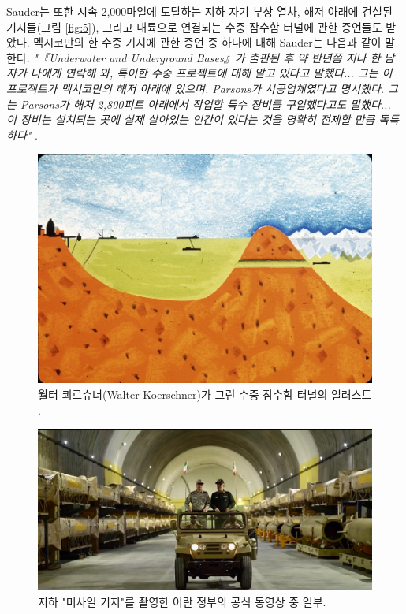 \documentclass[10pt,twocolumn,letterpaper]{article}
\begin{document}
Sauder는 또한 시속 2,000마일에 도달하는 지하 자기 부상 열차, 해저 아래에 건설된 기지들(그림 \ref{fig:5}), 그리고 내륙으로 연결되는 수중 잠수함 터널에 관한 증언들도 받았다. 멕시코만의 한 수중 기지에 관한 증언 중 하나에 대해 Sauder는 다음과 같이 말한다. \textit{"『Underwater and Underground Bases』가 출판된 후 약 반년쯤 지나 한 남자가 나에게 연락해 와, 특이한 수중 프로젝트에 대해 알고 있다고 말했다... 그는 이 프로젝트가 멕시코만의 해저 아래에 있으며, Parsons가 시공업체였다고 명시했다. 그는 Parsons가 해저 2,800피트 아래에서 작업할 특수 장비를 구입했다고도 말했다... 이 장비는 설치되는 곳에 실제 살아있는 인간이 있다는 것을 명확히 전제할 만큼 독특하다"} \cite{22}.

\begin{figure}[t]
\begin{center}
   \includegraphics[width=1\linewidth]{sub.jpg}
\end{center}
   \caption{월터 쾨르슈너(Walter Koerschner)가 그린 수중 잠수함 터널의 일러스트 \cite{22,23}.}
\label{fig:6}
\label{fig:onecol}
\end{figure}

\begin{figure}[t]
\begin{center}
   \includegraphics[width=1\linewidth]{iran.jpeg}
\end{center}
   \caption{지하 "미사일 기지"를 촬영한 이란 정부의 공식 동영상 중 일부\cite{39,40}.}
\label{fig:12}
\label{fig:onecol}
\end{figure}
\end{document}
